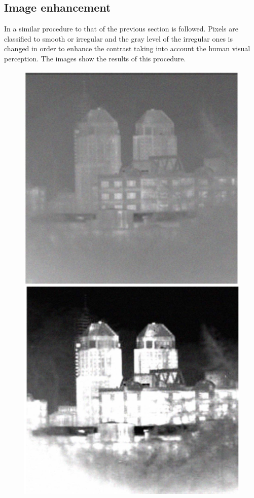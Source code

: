 \documentclass[oneside,a4paper,english,links,12pt]{article}
\begin{document}
\subsection{Image enhancement}
In \cite{Yu2012} a similar procedure to that of the previous section is followed. Pixels are classified to smooth or irregular and the gray level of the irregular ones is changed in order to enhance the contrast taking into account the human visual perception. The images show the results of this procedure.
\begin{figure}[htb]
\centering
\includegraphics[scale=0.15]{imagenes/enhance}
\includegraphics[scale=0.15]{imagenes/enhanceeq}

\end{figure}
\end{document}
